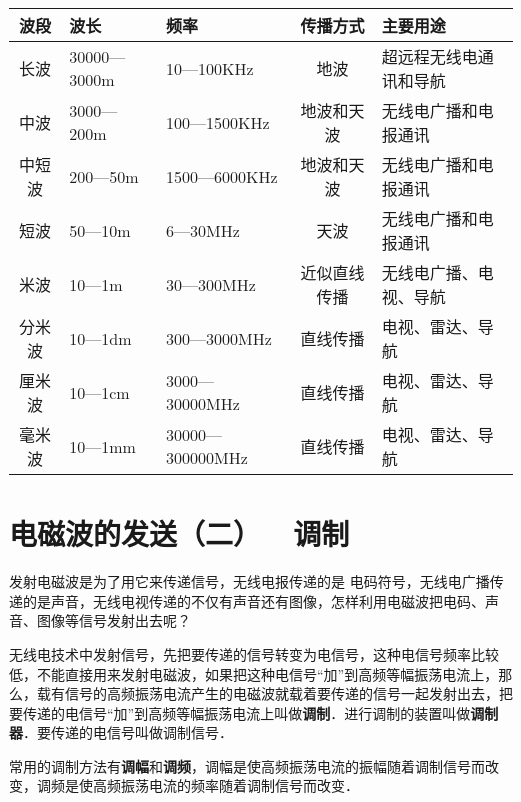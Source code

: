\begin{center}
\begin{tabular}{cp{}p{}cp{}}
	\hline
	波段  &  波长  & 频率 & 传播方式 & 主要用途
\\
\hline
长波    &  30000—3000m  & 10—100KHz   &地波    & 超远程无线电通讯和导航\\
中波   & 3000—200m   & 100—1500KHz   & 地波和天波   & 无线电广播和电报通讯\\
中短波   & 200—50m   & 1500—6000KHz  & 地波和天波   & 无线电广播和电报通讯\\
短波 & 50—10m   & 6—30MHz & 天波   & 无线电广播和电报通讯\\
米波 & 10—1m   & 30—300MHz   & 近似直线传播   &  无线电广播、电视、导航\\
分米波 & 10—1dm   & 300—3000MHz   & 直线传播   &  电视、雷达、导航\\  
厘米波& 10—1cm   &  3000—30000MHz   & 直线传播   &  电视、雷达、导航\\ 
毫米波 & 10—1mm 
  & 30000—300000MHz   & 直线传播   &  电视、雷达、导航\\
\hline
\end{tabular}

\end{center}


\section{电磁波的发送（二）~~调制}
发射电磁波是为了用它来传递信号，无线电报传递的是
电码符号，无线电广播传递的是声音，无线电视传递的不仅有声音还有图像，怎样利用电磁波把电码、声音、图像等信号发射出去呢？

无线电技术中发射信号，先把要传递的信号转变为电信号，这种电信号频率比较低，不能直接用来发射电磁波，如果把这种电信号“加”到高频等幅振荡电流上，那么，载有信号的高频振荡电流产生的电磁波就载着要传递的信号一起发射出去，把要传递的电信号“加”到高频等幅振荡电流上叫做\textbf{调制}．进行调制的装置叫做\textbf{调制器}．要传递的电信号叫做调制信号．

常用的调制方法有\textbf{调幅}和\textbf{调频}，调幅是使高频振荡电流的振幅随着调制信号而改变，调频是使高频振荡电流的频率随着调制信号而改变．

